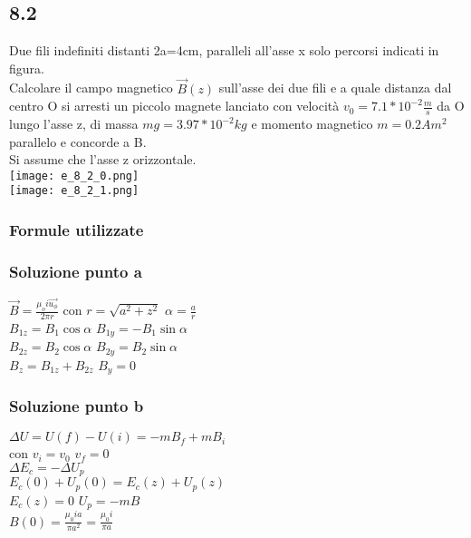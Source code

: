 \documentclass[../../main.tex]{subfiles}
\begin{document}
\subsection*{8.2}
Due fili indefiniti distanti 2a=4cm, paralleli all'asse x solo percorsi indicati in figura.
\\Calcolare il campo magnetico $\vec{B}(z)$ sull'asse dei due fili e a quale distanza dal centro O si arresti un piccolo magnete lanciato con velocità $v_0 = 7.1 * 10^{-2}\frac{m}{s}$ da O lungo l'asse z, di massa $mg = 3.97 * 10^{-2}kg$ e momento magnetico $m=0.2Am^2$ parallelo e concorde a B.
\\Si assume che l'asse z orizzontale.
\\\texttt{[image: e\_8\_2\_0.png]}
\\\texttt{[image: e\_8\_2\_1.png]}
\subsubsection*{Formule utilizzate}
\subsubsection*{Soluzione punto a}
$\vec{B} = \frac{\mu_oi\vec{u_\phi}}{2\pi r}$ con $r = \sqrt{a^2+z^2}$   $\alpha=\frac{a}{r}$
\\$B_{1z} = B_1\cos\alpha$   $B_{1y}=-B_1\sin\alpha$
\\$B_{2z} = B_2\cos\alpha$   $B_{2y}=B_2\sin\alpha$
\\$B_z = B_{1z} + B_{2z}$   $B_y = 0$
\subsubsection*{Soluzione punto b}
$\Delta U = U(f)-U(i) = -mB_f + mB_i$
\\con $v_i =v_0$   $v_f = 0$
\\$\Delta E_c = -\Delta U_p$
\\$E_c(0) + U_p(0) = E_c(z) + U_p(z)$
\\$E_c(z) = 0$   $U_p = -mB$
\\$B(0) = \frac{\mu_0ia}{\pi a^2} = \frac{\mu_0 i}{\pi a}$
\newpage
\end{document}
